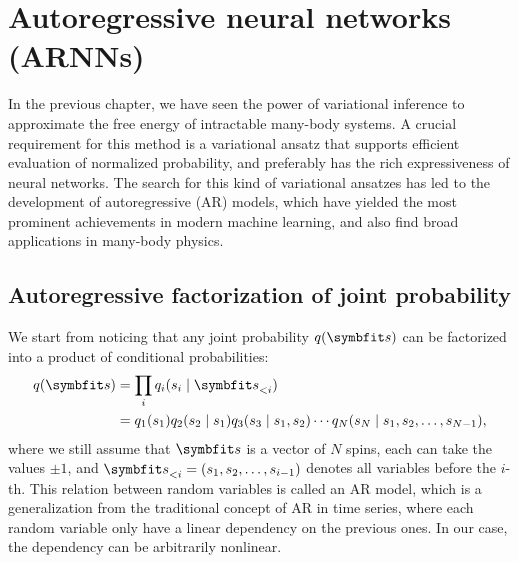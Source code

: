 \chapter{Autoregressive neural networks (ARNNs)}
\label{ch:arnn}

In the previous chapter, we have seen the power of variational inference to approximate the free energy of intractable many-body systems. A crucial requirement for this method is a variational ansatz that supports efficient evaluation of normalized probability, and preferably has the rich expressiveness of neural networks. The search for this kind of variational ansatzes has led to the development of autoregressive (AR) models, which have yielded the most prominent achievements in modern machine learning, and also find broad applications in many-body physics.

\section{Autoregressive factorization of joint probability}

We start from noticing that any joint probability $q(\vs)$ can be factorized into a product of conditional probabilities:
\begin{align}
q(\vs) &= \prod_i q_i(s_i \mid \vs_{< i}) \label{eq:autoreg} \\
&= q_1(s_1) q_2(s_2 \mid s_1) q_3(s_3 \mid s_1, s_2) \cdots q_N(s_N \mid s_1, s_2, \ldots, s_{N - 1}),
\end{align}
where we still assume that $\vs$ is a vector of $N$ spins, each can take the values $\pm 1$, and $\vs_{< i} = (s_1, s_2, \ldots, s_{i - 1})$ denotes all variables before the $i$-th. This relation between random variables is called an AR model, which is a generalization from the traditional concept of AR in time series, where each random variable only have a linear dependency on the previous ones. In our case, the dependency can be arbitrarily nonlinear.

